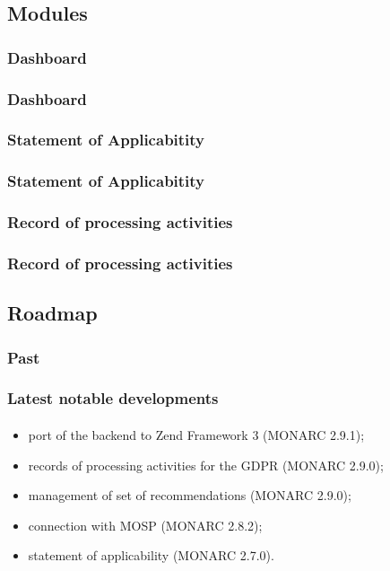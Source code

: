 \subsection{Modules}
\subsubsection{Dashboard}
\begin{frame}
    \frametitle{Dashboard}
    \framesubtitle{}
\end{frame}

\subsubsection{Statement of Applicabitity}
\begin{frame}
    \frametitle{Statement of Applicabitity}
    \framesubtitle{}
\end{frame}

\subsubsection{Record of processing activities}
\begin{frame}
    \frametitle{Record of processing activities}
    \framesubtitle{}
\end{frame}



\subsection{Roadmap}
\subsubsection{Past}
\begin{frame}
    \frametitle{Latest notable developments}
    \framesubtitle{}
    \begin{itemize}
        \item port of the backend to Zend Framework 3 (MONARC 2.9.1);
        \item records of processing activities for the GDPR (MONARC 2.9.0);
        \item management of set of recommendations (MONARC 2.9.0);
        \item connection with MOSP (MONARC 2.8.2);
        \item statement of applicability (MONARC 2.7.0).
    \end{itemize}
\end{frame}

